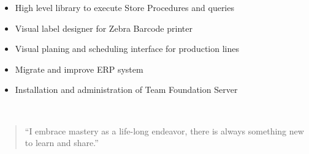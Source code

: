 \documentclass[10pt,letterpaper,ragged2d,withhyper]{altacv}
\begin{document}
\begin{paracol}{2}
\divider

\begin{itemize}
\item High level library to execute Store Procedures and queries
\item Visual label designer for Zebra Barcode printer
\item Visual planing and scheduling interface for production lines
\item Migrate and improve ERP system
\item Installation and administration of Team Foundation Server
\end{itemize}

\\

% 
% 
% 
% 
% 
% 
% 


\switchcolumn


\begin{quote}
``I embrace mastery as a life-long endeavor, there is always something new to learn and share.''
\end{quote}



\end{paracol}
\end{document}
